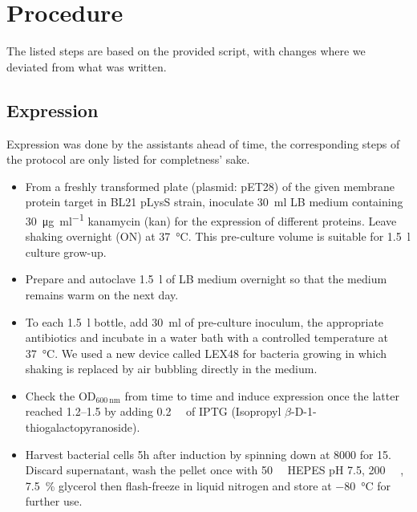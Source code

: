 \documentclass[a4paper]{scrreprt}
\title{\mytitle{}}
\author{Michael Senn \maillink{michael.senn@students.unibe.ch} - 16-126-880}
\date{\printdate}
\begin{document}
\maketitle

\chapter{Procedure}

The listed steps are based on the provided script, with changes where we
deviated from what was written.

\section{Expression}

Expression was done by the assistants ahead of time, the corresponding steps of
the protocol are only listed for completness' sake.

\begin{itemize}
	\item From a freshly transformed plate (plasmid: pET28) of the given
		membrane protein target in BL21 pLysS strain, inoculate
		\SI{30}{\ml} LB medium containing \SI{30}{\ug \per \ml}
		kanamycin (kan) for the expression of different proteins. Leave
		shaking overnight (ON) at \SI{37}{\celsius}. This pre-culture
		volume is suitable for \SI{1.5}{\l} culture grow-up.

	\item Prepare and autoclave \SI{1.5}{\l} of LB medium overnight so that
		the medium remains warm on the next day.

	\item To each \SI{1.5}{\l} bottle, add \SI{30}{\ml} of pre-culture
		inoculum, the appropriate antibiotics and incubate in a water
		bath with a controlled temperature at \SI{37}{\celsius}. We
		used a new device called LEX48 for bacteria growing in which
		shaking is replaced by air bubbling directly in the medium.

	\item Check the OD$_{\SI{600}{\nm}}$ from time to time and induce
		expression once the latter reached \numrange{1.2}{1.5} by adding
		\SI{0.2}{\milli\Molar} of IPTG (Isopropyl
		$\beta$-D-1-thiogalactopyranoside).

	\item Harvest bacterial cells 5h after induction by spinning down at
		\SI{8000}{\rpm} for \SI{15}{\min}. Discard supernatant, wash
		the pellet once with \SI{50}{\milli\Molar} HEPES pH 7.5,
		\SI{200}{\milli\Molar} , \SI{7.5}{\percent} glycerol
		then flash-freeze in liquid nitrogen and store at
		\SI{-80}{\celsius} for further use.
\end{itemize}
\end{document}
